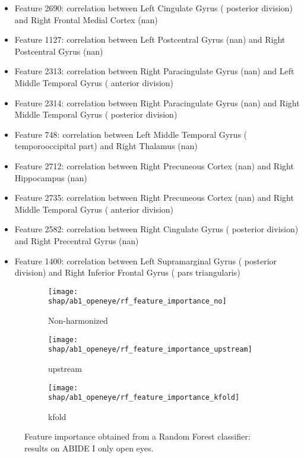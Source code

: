 \documentclass[11pt]{report}
\begin{document}
\begin{itemize}
\item Feature 2690: correlation between Left Cingulate Gyrus ( posterior division) and Right Frontal Medial Cortex (nan)
\item Feature 1127: correlation between Left Postcentral Gyrus (nan) and Right Postcentral Gyrus (nan)
\item Feature 2313: correlation between Right Paracingulate Gyrus (nan) and Left Middle Temporal Gyrus ( anterior division)
\item Feature 2314: correlation between Right Paracingulate Gyrus (nan) and Right Middle Temporal Gyrus ( posterior division)
\item Feature 748: correlation between Left Middle Temporal Gyrus ( temporooccipital part) and Right Thalamus (nan)
\item Feature 2712: correlation between Right Precuneous Cortex (nan) and Right Hippocampus (nan)
\item Feature 2735: correlation between Right Precuneous Cortex (nan) and Right Middle Temporal Gyrus ( anterior division)
\item Feature 2582: correlation between Right Cingulate Gyrus ( posterior division) and Right Precentral Gyrus (nan)
\item Feature 1400: correlation between Left Supramarginal Gyrus ( posterior division) and Right Inferior Frontal Gyrus ( pars triangularis)
\end{itemize}


\begin{figure}
\centering
\begin{subfigure}[b]{.45\textwidth}
   \texttt{[image: shap/ab1\_openeye/rf\_feature\_importance\_no]}
   \caption{Non-harmonized}
   \label{}
\end{subfigure}
\begin{subfigure}[b]{.45\textwidth}
   \texttt{[image: shap/ab1\_openeye/rf\_feature\_importance\_upstream]}
   \caption{upstream}
   \label{}
\end{subfigure}
\begin{subfigure}[b]{.45\textwidth}
   \texttt{[image: shap/ab1\_openeye/rf\_feature\_importance\_kfold]}
   \caption{kfold}
   \label{}
\end{subfigure}
\caption{Feature importance obtained from a Random Forest classifier: results on ABIDE I only open eyes.}
\label{fig:rf_feature_importance_ab1}
\end{figure}
\end{document}
